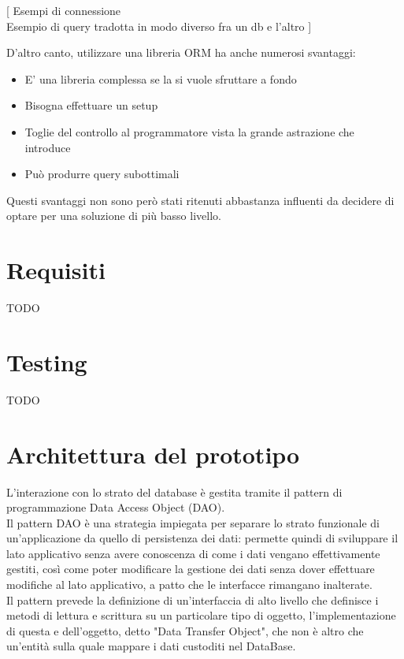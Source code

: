 \documentclass[a4paper, 12pt]{scrartcl}
\begin{document}
        [
            Esempi di connessione\\
            Esempio di query tradotta in modo diverso fra un db e l'altro
        ]

        D'altro canto, utilizzare una libreria ORM ha anche numerosi svantaggi:
        \begin{itemize}
          \item E' una libreria complessa se la si vuole sfruttare a fondo
          \item Bisogna effettuare un setup
          \item Toglie del controllo al programmatore vista la grande astrazione che introduce
          \item Può produrre query subottimali
        \end{itemize}
        Questi svantaggi non sono però stati ritenuti abbastanza influenti da decidere di optare per una soluzione di più basso livello.\\
  \newpage
  \section*{Requisiti}
    TODO

  \newpage
  \section*{Testing}
    TODO

  \newpage  
  \section*{Architettura del prototipo}
    L'interazione con lo strato del database è gestita tramite il pattern di programmazione Data Access Object (DAO).\\
    Il pattern DAO è una strategia impiegata per separare lo strato funzionale di un'applicazione da quello di persistenza dei dati: permette quindi di sviluppare il lato applicativo senza avere conoscenza di come i dati vengano effettivamente gestiti, così come poter modificare la gestione dei dati
    senza dover effettuare modifiche al lato applicativo, a patto che le interfacce rimangano inalterate.\\
    Il pattern prevede la definizione di un'interfaccia di alto livello che definisce i metodi di lettura e scrittura su un particolare tipo di oggetto, l'implementazione di questa e dell'oggetto, detto "Data Transfer Object", che non è altro che un'entità sulla quale mappare i dati custoditi nel DataBase.\\
    
\end{document}
